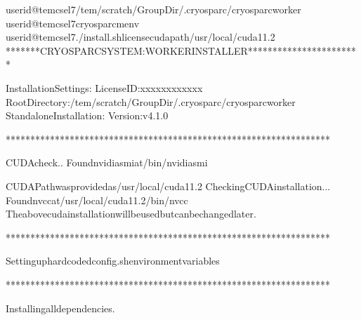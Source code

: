 \documentclass[a4paper,11pt,english]{sphinxmanual}
\begin{document}
\begin{sphinxVerbatim}[commandchars=\\\{\}]
userid@tem\PYGZhy{}cs\PYGZhy{}el7\PYGZdl{}\PYGZgt{}/tem/scratch/\PYGZlt{}GroupDir\PYGZgt{}/.cryosparc/cryosparc\PYGZus{}worker
userid@tem\PYGZhy{}cs\PYGZhy{}el7\PYGZdl{}\PYGZgt{}cryosparcmenv
userid@tem\PYGZhy{}cs\PYGZhy{}el7\PYGZdl{}\PYGZgt{}./install.sh\PYGZhy{}\PYGZhy{}license\PYGZhy{}\PYGZhy{}cudapath/usr/local/cuda\PYGZhy{}11.2
*******CRYOSPARCSYSTEM:WORKERINSTALLER***********************

InstallationSettings:
LicenseID:xxxxxxxxxxxx
RootDirectory:/tem/scratch/\PYGZlt{}GroupDir\PYGZgt{}/.cryosparc/cryosparc\PYGZus{}worker
StandaloneInstallation:
Version:v4.1.0

******************************************************************

CUDAcheck..
Foundnvidia\PYGZhy{}smiat/bin/nvidia\PYGZhy{}smi

CUDAPathwasprovidedas/usr/local/cuda\PYGZhy{}11.2
CheckingCUDAinstallation...
Foundnvccat/usr/local/cuda\PYGZhy{}11.2/bin/nvcc
Theabovecudainstallationwillbeusedbutcanbechangedlater.

******************************************************************

Settinguphard\PYGZhy{}codedconfig.shenvironmentvariables

******************************************************************

Installingalldependencies.


\end{sphinxVerbatim}
\end{document}
